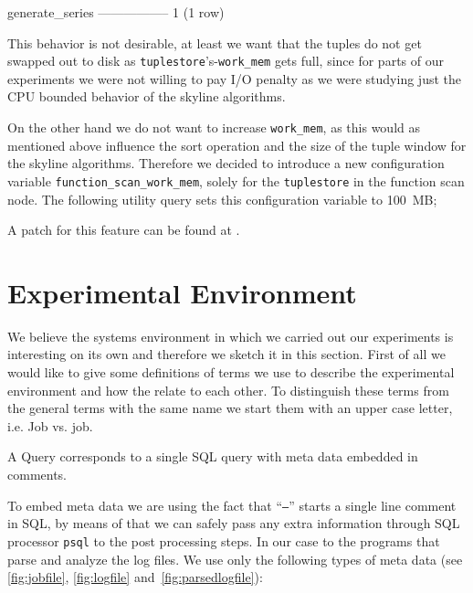 \begin{interactive}
 generate_series
-----------------
               1
(1 row)
\end{interactive}

This behavior is not desirable, at least we want that the tuples do
not get swapped out to disk as
\texttt{tuplestore}'s-\texttt{work\_mem} gets full, since for parts
of our experiments we were not willing to pay I/O penalty as we were
studying just the CPU bounded behavior of the skyline algorithms.

On the other hand we do not want to increase \texttt{work\_mem}, as
this would as mentioned above influence the sort operation and the size
of the tuple window for the skyline algorithms. Therefore we decided
to introduce a new configuration variable
\texttt{function\_scan\_work\_mem}, solely for the \texttt{tuplestore}
in the function scan node. The following utility query sets this
configuration variable to 100~MB;

\begin{interactive}
\end{interactive}

\noindent
A patch for this feature can be found at
.


\section{Experimental Environment}
\label{sec:experimentalenvironment}
We believe the systems environment in which we carried out our
experiments is interesting on its own and therefore we sketch it in
this section.
%
First of all we would like to give some definitions of terms we use to
describe the experimental environment and how the relate to each
other. To distinguish these terms from the general terms with the same
name we start them with an upper case letter, i.e. Job vs. job.

\begin{definition}[Query]
A Query corresponds to a single SQL query with meta data embedded in
comments.
\end{definition}

\noindent
To embed meta data we are using the fact that ``\texttt{--}'' starts a
single line comment in SQL, by means of that we can safely pass any
extra information through SQL processor \texttt{psql} to the post
processing steps. In our case to the programs that parse and analyze
the log files. We use only the following types of meta data (see
\autoref{fig:jobfile}, \ref{fig:logfile}
and~\ref{fig:parsedlogfile}):

